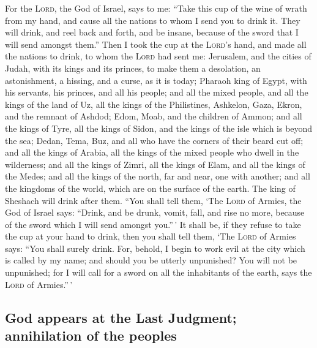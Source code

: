  For the \textsc{Lord}, the God of Israel, says to me:
``Take this cup of the wine of wrath from my hand, and cause all the
nations to whom I send you to drink it.  They will drink,
and reel back and forth, and be insane, because of the sword that I will
send amongst them.''  Then I took the cup at the
\textsc{Lord}'s hand, and made all the nations to drink, to whom the
\textsc{Lord} had sent me:  Jerusalem, and the cities of
Judah, with its kings and its princes, to make them a desolation, an
astonishment, a hissing, and a curse, as it is today; 
Pharaoh king of Egypt, with his servants, his princes, and all his
people;  and all the mixed people, and all the kings of
the land of Uz, all the kings of the Philistines, Ashkelon, Gaza, Ekron,
and the remnant of Ashdod;  Edom, Moab, and the children
of Ammon;  and all the kings of Tyre, all the kings of
Sidon, and the kings of the isle which is beyond the sea;
 Dedan, Tema, Buz, and all who have the corners of their
beard cut off;  and all the kings of Arabia, all the
kings of the mixed people who dwell in the wilderness; 
and all the kings of Zimri, all the kings of Elam, and all the kings of
the Medes;  and all the kings of the north, far and near,
one with another; and all the kingdoms of the world, which are on the
surface of the earth. The king of Sheshach will drink after them.
 ``You shall tell them, `The \textsc{Lord} of Armies, the
God of Israel says: ``Drink, and be drunk, vomit, fall, and rise no
more, because of the sword which I will send amongst you.''\,'
 It shall be, if they refuse to take the cup at your hand
to drink, then you shall tell them, `The \textsc{Lord} of Armies says:
``You shall surely drink.  For, behold, I begin to work
evil at the city which is called by my name; and should you be utterly
unpunished? You will not be unpunished; for I will call for a sword on
all the inhabitants of the earth, says the \textsc{Lord} of Armies.''\,'

\hypertarget{god-appears-at-the-last-judgment-annihilation-of-the-peoples}{%
\subsection{God appears at the Last Judgment; annihilation of the
peoples}\label{god-appears-at-the-last-judgment-annihilation-of-the-peoples}}

